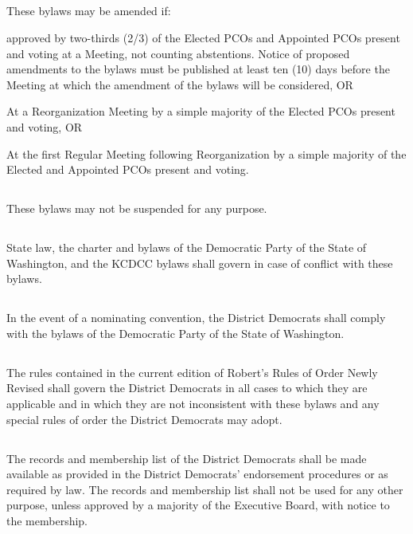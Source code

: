 \subsection{}
These bylaws may be amended if:
\begin{inlinealphalist}
    \item approved by two-thirds (2/3) of the Elected PCOs and Appointed PCOs present and voting at a Meeting, not counting abstentions. Notice of proposed amendments to the bylaws must be published at least ten (10) days before the Meeting at which the amendment of the bylaws will be considered, OR
    \item At a Reorganization Meeting by a simple majority of the Elected PCOs present and voting, OR
    \item At the first Regular Meeting following Reorganization by a simple majority of the Elected and Appointed PCOs present and voting.
\end{inlinealphalist}

\subsection{}
These bylaws may not be suspended for any purpose.

\subsection{}
State law, the charter and bylaws of the Democratic Party of the State of Washington, and the KCDCC bylaws shall govern in case of conflict with these bylaws.

\subsection{}
In the event of a nominating convention, the \fortythird{} District Democrats shall comply with the bylaws of the Democratic Party of the State of Washington.

\subsection{}
The rules contained in the current edition of Robert’s Rules of Order Newly Revised shall govern the \fortythird{} District Democrats in all cases to which they are applicable and in which they are not inconsistent with these bylaws and any special rules of order the \fortythird{} District Democrats may adopt.

\subsection{}
The records and membership list of the \fortythird{} District Democrats shall be made available as provided in the \fortythird{} District Democrats’ endorsement procedures or as required by law. The records and membership list shall not be used for any other purpose, unless approved by a majority of the Executive Board, with notice to the membership.


